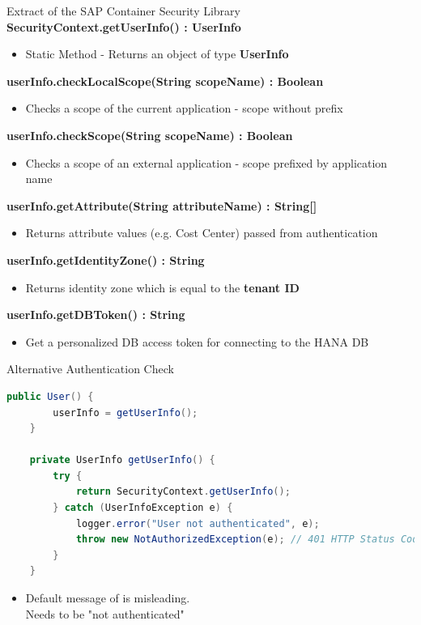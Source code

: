\begin{frame}[t]{Extract of the SAP Container Security Library}
\textbf{SecurityContext.getUserInfo() : UserInfo}
	\begin{itemize}
		\item \scriptsize Static Method - Returns an object of type \textbf{UserInfo}
	\end{itemize}
		\textbf{userInfo.checkLocalScope(String scopeName) : Boolean}
	\begin{itemize}
		\item  \scriptsize Checks a scope of the current application - scope without prefix
	\end{itemize}
\textbf{userInfo.checkScope(String scopeName) : Boolean}
	\begin{itemize}
		\item  \scriptsize Checks a scope of an external application - scope prefixed by application name
	\end{itemize}
\textbf{userInfo.getAttribute(String attributeName) : String[]}
	\begin{itemize}
		\item  \scriptsize Returns attribute values (e.g. Cost Center) passed from authentication
	\end{itemize}
\textbf{userInfo.getIdentityZone() : String}
	\begin{itemize}
		\item  \scriptsize Returns identity zone which is equal to the \textbf{tenant ID}
	\end{itemize}
\textbf{userInfo.getDBToken() : String}
	\begin{itemize}
		\item  \scriptsize Get a personalized DB access token for connecting to the HANA DB
	\end{itemize}
\end{frame}


\begin{frame}[fragile,t]{Alternative Authentication Check}
\vspace{-3mm}
\begin{lstlisting}[language=java]
    public User() {
        userInfo = getUserInfo();
    }

    private UserInfo getUserInfo() {
        try {
            return SecurityContext.getUserInfo();
        } catch (UserInfoException e) {
            logger.error("User not authenticated", e);
            throw new NotAuthorizedException(e); // 401 HTTP Status Code
        }
    }
\end{lstlisting}
\begin{itemize}
	\item Default message of  is misleading. \\Needs to be "not authenticated"
\end{itemize}
\end{frame}



